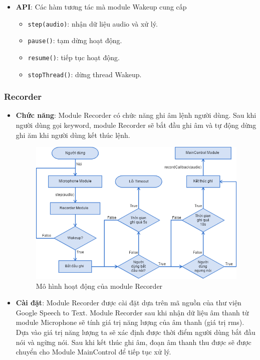 \begin{itemize}
\item \textbf{API}: Các hàm tương tác mà module Wakeup cung cấp
\begin{itemize}
\item \lstinline{step(audio)}: nhận dữ liệu audio và xử lý.
\item \lstinline{pause()}: tạm dừng hoạt động.
\item \lstinline{resume()}: tiếp tục hoạt động.
\item \lstinline{stopThread()}: dừng thread Wakeup.
\end{itemize}
\end{itemize}

\subsubsection{Recorder}
\begin{itemize}
\item \textbf{Chức năng}: Module Recorder có chức năng ghi âm lệnh người dùng. Sau khi người dùng gọi keyword, module Recorder sẽ bắt đầu ghi âm và tự động dừng ghi ăm khi người dùng kết thúc lệnh.

\begin{figure}[h]
    \centering
    \includegraphics[scale=0.5]{recorder_flowchart}
    \caption{Mô hình hoạt động của module Recorder}
    \label{fig:c6_recorder_flowchart}
\end{figure}

\item \textbf{Cài đặt}: Module Recorder được cài đặt dựa trên mã nguồn của thư viện Google Speech to Text. Module Recorder sau khi nhận dữ liệu âm thanh từ module Microphone sẽ tính giá trị năng lượng của âm thanh (giá trị rms). Dựa vào giá trị năng lượng ta sẽ xác định được thời điểm người dùng bắt đầu nói và ngừng nói. Sau khi kết thúc ghi âm, đoạn âm thanh thu được sẽ được chuyển cho Module MainControl để tiếp tục xử lý.


\end{itemize}
